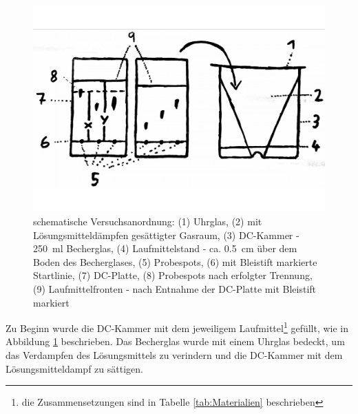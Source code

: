 \documentclass{article}
\begin{document}
        \begin{figure}[H]
          \includegraphics[scale=0.13, center]{Graphiken/Versuchsanordnungen/VersuchsanordnungDC.png} 
          \caption[schematische Versuchsanordnung Dünnschichtchromatographie, Quelle: Autor]{schematische Versuchsanordnung: (1) Uhrglas, (2) mit Lösungsmitteldämpfen gesättigter Gasraum, (3) DC-Kammer - \SI[mode=text,separate-uncertainty=true]{250}{\milli\litre} Becherglas, (4) Laufmittelstand - ca. \SI[mode=text]{0.5}{\centi\meter} über dem Boden des Becherglases, (5) Probespots, (6) mit Bleistift markierte Startlinie, (7) DC-Platte, (8) Probespots nach erfolgter Trennung, (9) Laufmittelfronten - nach Entnahme der DC-Platte mit Bleistift markiert}
          \label{fig:Versuchsanordnung}
        \end{figure}
    
        Zu Beginn wurde die DC-Kammer mit dem jeweiligem Laufmittel\footnote{die Zusammensetzungen sind in Tabelle \ref{tab:Materialien} beschrieben} gefüllt, wie in Abbildung \ref{fig:Versuchsanordnung} beschrieben. Das Becherglas wurde mit einem Uhrglas bedeckt, um das Verdampfen des Lösungsmittels zu verindern und die DC-Kammer mit dem Lösungsmitteldampf zu sättigen. 
        
\end{document}
